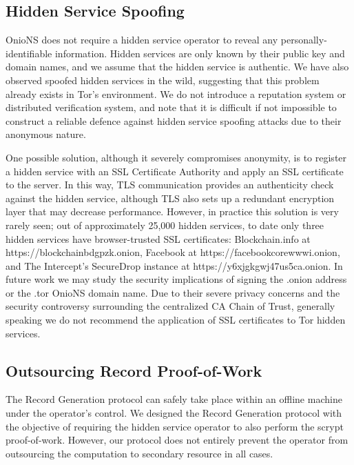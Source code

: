 \documentclass{sig-alternate}
\begin{document}
\subsection{Hidden Service Spoofing}

OnioNS does not require a hidden service operator to reveal any personally-identifiable information. Hidden services are only known by their public key and domain names, and we assume that the hidden service is authentic. We have also observed spoofed hidden services in the wild, suggesting that this problem already exists in Tor's environment. We do not introduce a reputation system or distributed verification system, and note that it is difficult if not impossible to construct a reliable defence against hidden service spoofing attacks due to their anonymous nature. 

One possible solution, although it severely compromises anonymity, is to register a hidden service with an SSL Certificate Authority and apply an SSL certificate to the server. In this way, TLS communication provides an authenticity check against the hidden service, although TLS also sets up a redundant encryption layer that may decrease performance. However, in practice this solution is very rarely seen; out of approximately 25,000 hidden services,\cite{TorMetrics}\cite{kadianakis2015extrapolating} to date only three hidden services have browser-trusted SSL certificates: Blockchain.info at https://blockchainbdgpzk.onion, Facebook at https://facebookcorewwwi.onion, and The Intercept's SecureDrop instance at https://y6xjgkgwj47us5ca.onion. In future work we may study the security implications of signing the .onion address or the .tor OnioNS domain name. Due to their severe privacy concerns and the security controversy surrounding the centralized CA Chain of Trust, generally speaking we do not recommend the application of SSL certificates to Tor hidden services. 

\subsection{Outsourcing Record Proof-of-Work}


The Record Generation protocol can safely take place within an offline machine under the operator's control. We designed the Record Generation protocol with the objective of requiring the hidden service operator to also perform the scrypt proof-of-work. However, our protocol does not entirely prevent the operator from outsourcing the computation to secondary resource in all cases.
\end{document}
